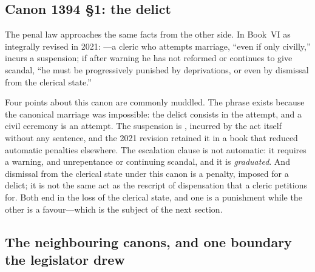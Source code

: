 \subsection{Canon 1394 §1: the delict}

The penal law approaches the same facts from the other side. In Book~VI as integrally revised in 2021: ---a cleric who attempts marriage, ``even if only civilly,'' incurs a  suspension; if after warning he has not reformed or continues to give scandal, ``he must be progressively punished by deprivations, or even by dismissal from the clerical state.''

Four points about this canon are commonly muddled. The phrase  exists because the canonical marriage was impossible: the delict consists in the attempt, and a civil ceremony is an attempt. The suspension is , incurred by the act itself without any sentence, and the 2021 revision retained it in a book that reduced automatic penalties elsewhere. The escalation clause is not automatic: it requires a warning, and unrepentance or continuing scandal, and it is \emph{graduated}. And dismissal from the clerical state under this canon is a penalty, imposed for a delict; it is not the same act as the rescript of dispensation that a cleric petitions for. Both end in the loss of the clerical state, and one is a punishment while the other is a favour---which is the subject of the next section.

\subsection{The neighbouring canons, and one boundary the legislator drew}

